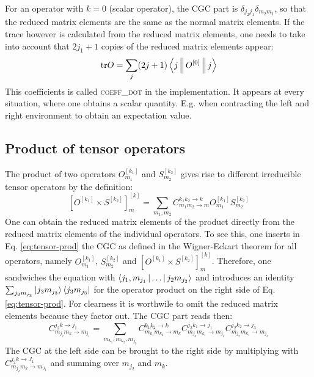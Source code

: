 \documentclass[a4paper,10pt,parskip=full]{scrartcl}
\begin{document}
For an operator with $k=0$ (scalar operator), the CGC part is $\delta_{j_2j_1}\delta_{m_2m_1}$,
so that the reduced matrix elements are the same as the normal matrix elements.
If the trace however is calculated from the reduced matrix elements,
one needs to take into account
that $2j_1+1$ copies of the reduced matrix elements appear:
\begin{equation}
  \text{tr}O=\sum_j(2j+1)\Braket{j||O^{[0]}||j}
\end{equation}
This coefficients is called \textsc{coeff\_dot} in the implementation.
It appears at every situation, where one obtains a scalar quantity.
E.g. when contracting the left and right environment to obtain an expectation value.
\subsection{Product of tensor operators}
The product of two operators $O^{[k_1]}_{m_1}$ and $S^{[k_2]}_{m_2}$
gives rise to different irreducible tensor operators by the definition:
\begin{equation}
  \label{eq:tensor-prod}
  \left[O^{[k_1]}\times S^{[k_2]}\right]^{[k]}_m = \sum_{m_1,m_2} C^{k_1k_2\rightarrow k}_{m_1m_2\rightarrow m} O^{[k_1]}_{m_1}S^{[k_2]}_{m_2}
\end{equation}
One can obtain the reduced matrix elements of the product directly from the reduced matrix elements
of the individual operators. To see this, one inserts in Eq. \eqref{eq:tensor-prod}
the CGC as defined in the Wigner-Eckart theorem for all operators, namely $O^{[k_1]}_{m_1}$,  $S^{[k_2]}_{m_2}$
and $\left[O^{[k_1]}\times S^{[k_2]}\right]^{[k]}_m$. Therefore, one sandwiches the equation with
$\Braket{j_1,m_{j_1}|\dots|j_2m_{j_2}}$ and introduces an identity $\sum_{j_3m_{j_3}}\Ket{j_3m_{j_3}}\Bra{j_3m_{j_3}}$
for the operator product on the right side of Eq. \eqref{eq:tensor-prod}.
For clearness it is worthwile to omit the reduced matrix elements because they factor out.
The CGC part reads then:
\begin{equation}
  C^{j_2k\rightarrow j_1}_{m_{j_2}m_k\rightarrow m_{j_1}}  =
  \sum_{m_{k_1},m_{k_2},m_{j_3}}
  C^{k_1k_2\rightarrow k}_{m_{k_1}m_{k_2}\rightarrow m_{k}}
  C^{j_3k_1\rightarrow j_1}_{m_{j_3}m_{k_1}\rightarrow m_{j_1}}
  C^{j_2k_2\rightarrow j_3}_{m_{j_2}m_{k_1}\rightarrow m_{j_3}}
\end{equation}
The CGC at the left side can be brought to the right side by multiplying
with $C^{j_2k\rightarrow J_1}_{m_{j_2}m_k\rightarrow m_{J_1}}$ and summing over $m_{j_2}$ and $m_k$.
\end{document}
